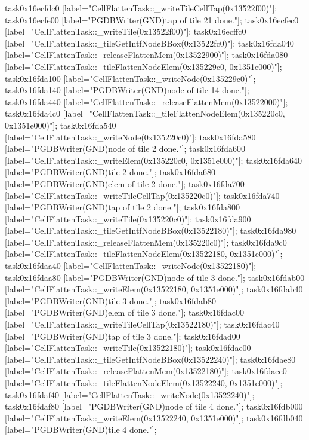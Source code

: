 {	task0x16ecfdc0 [label="CellFlattenTask::_writeTileCellTap(0x13522f00)"];
	task0x16ecfe00 [label="PGDBWriter(GND)\nCell tap of tile 21 done."];
	task0x16ecfec0 [label="CellFlattenTask::_writeTile(0x13522f00)"];
	task0x16ecffc0 [label="CellFlattenTask::_tileGetIntfNodeBBox(0x13522fc0)"];
	task0x16fda040 [label="CellFlattenTask::_releaseFlattenMem(0x13522900)"];
	task0x16fda080 [label="CellFlattenTask::_tileFlattenNodeElem(0x135229c0, 0x1351e000)"];
	task0x16fda100 [label="CellFlattenTask::_writeNode(0x135229c0)"];
	task0x16fda140 [label="PGDBWriter(GND)\nCell node of tile 14 done."];
	task0x16fda440 [label="CellFlattenTask::_releaseFlattenMem(0x13522000)"];
	task0x16fda4c0 [label="CellFlattenTask::_tileFlattenNodeElem(0x135220c0, 0x1351e000)"];
	task0x16fda540 [label="CellFlattenTask::_writeNode(0x135220c0)"];
	task0x16fda580 [label="PGDBWriter(GND)\nCell node of tile 2 done."];
	task0x16fda600 [label="CellFlattenTask::_writeElem(0x135220c0, 0x1351e000)"];
	task0x16fda640 [label="PGDBWriter(GND)\nCell tile 2 done."];
	task0x16fda680 [label="PGDBWriter(GND)\nCell elem of tile 2 done."];
	task0x16fda700 [label="CellFlattenTask::_writeTileCellTap(0x135220c0)"];
	task0x16fda740 [label="PGDBWriter(GND)\nCell tap of tile 2 done."];
	task0x16fda800 [label="CellFlattenTask::_writeTile(0x135220c0)"];
	task0x16fda900 [label="CellFlattenTask::_tileGetIntfNodeBBox(0x13522180)"];
	task0x16fda980 [label="CellFlattenTask::_releaseFlattenMem(0x135220c0)"];
	task0x16fda9c0 [label="CellFlattenTask::_tileFlattenNodeElem(0x13522180, 0x1351e000)"];
	task0x16fdaa40 [label="CellFlattenTask::_writeNode(0x13522180)"];
	task0x16fdaa80 [label="PGDBWriter(GND)\nCell node of tile 3 done."];
	task0x16fdab00 [label="CellFlattenTask::_writeElem(0x13522180, 0x1351e000)"];
	task0x16fdab40 [label="PGDBWriter(GND)\nCell tile 3 done."];
	task0x16fdab80 [label="PGDBWriter(GND)\nCell elem of tile 3 done."];
	task0x16fdac00 [label="CellFlattenTask::_writeTileCellTap(0x13522180)"];
	task0x16fdac40 [label="PGDBWriter(GND)\nCell tap of tile 3 done."];
	task0x16fdad00 [label="CellFlattenTask::_writeTile(0x13522180)"];
	task0x16fdae00 [label="CellFlattenTask::_tileGetIntfNodeBBox(0x13522240)"];
	task0x16fdae80 [label="CellFlattenTask::_releaseFlattenMem(0x13522180)"];
	task0x16fdaec0 [label="CellFlattenTask::_tileFlattenNodeElem(0x13522240, 0x1351e000)"];
	task0x16fdaf40 [label="CellFlattenTask::_writeNode(0x13522240)"];
	task0x16fdaf80 [label="PGDBWriter(GND)\nCell node of tile 4 done."];
	task0x16fdb000 [label="CellFlattenTask::_writeElem(0x13522240, 0x1351e000)"];
	task0x16fdb040 [label="PGDBWriter(GND)\nCell tile 4 done."];
}
